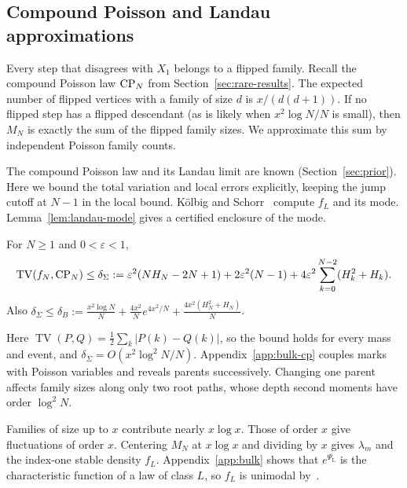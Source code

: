 \subsection{Compound Poisson and Landau approximations}

Every step that disagrees with $X_1$ belongs to a flipped family.
Recall the compound Poisson law $\mathrm{CP}_N$ from Section~\ref{sec:rare-results}.
The expected number of flipped vertices with a family of size $d$
is $x/(d(d+1))$. If no flipped step has a flipped descendant (as is
likely when $x^2\log N/N$ is small), then $M_N$ is exactly the sum
of the flipped family sizes. We approximate this sum by independent
Poisson family counts.

The compound Poisson law and its Landau limit are known
(Section~\ref{sec:prior}). Here we bound the total variation and local
errors explicitly, keeping the jump cutoff at $N-1$ in the local bound.
K\"olbig and Schorr~\cite{ks1984} compute $f_L$ and its mode.
Lemma~\ref{lem:landau-mode} gives a certified enclosure of the mode.

\begin{theorem}\label{thm:cp}
For $N\ge1$ and $0<\varepsilon<1$,
\[
 \operatorname{TV}(f_N,\mathrm{CP}_N)\le\delta_\Sigma
 :=\varepsilon^2(NH_N-2N+1)+2\varepsilon^2(N-1)+4\varepsilon^2\sum_{k=0}^{N-2}(H_k^2+H_k).
\]
Also $\delta_\Sigma\le\delta_B
 :=\frac{x^2\log N}{N}+\frac{4x^2}{N}e^{4x^2/N}+\frac{4x^2(H_N^2+H_N)}{N}$.
\end{theorem}

Here $\operatorname{TV}(P,Q)=\frac12\sum_k|P(k)-Q(k)|$, so the bound
holds for every mass and event, and $\delta_\Sigma=O(x^2\log^2N/N)$.
Appendix~\ref{app:bulk-cp} couples marks with Poisson variables and
reveals parents successively. Changing one parent affects family sizes
along only two root paths, whose depth second moments have order $\log^2N$.

Families of size up to $x$ contribute nearly $x\log x$. Those of order $x$ give fluctuations of order $x$. Centering $M_N$ at $x\log x$ and
dividing by $x$ gives $\lambda_m$ and the index-one stable density $f_L$.
Appendix~\ref{app:bulk} shows that $e^{\Psi_{\mathrm L}}$ is the characteristic function
of a law of class $L$, so $f_L$ is unimodal by~\cite{yamazato1978}.

